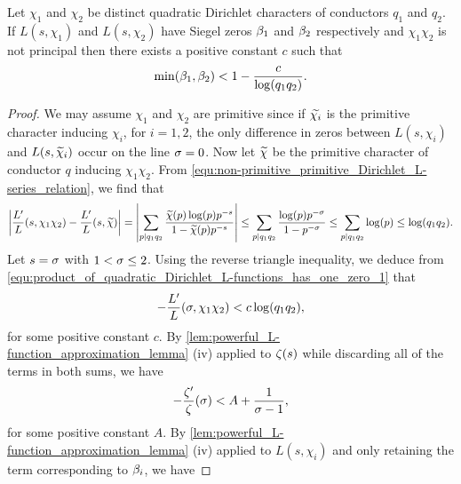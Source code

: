     \begin{proposition}\label{prop:product_of_quadratic_Dirichlet_L-functions_has_one_zero}
      Let $\chi_{1}$ and $\chi_{2}$ be distinct quadratic Dirichlet characters of conductors $q_{1}$ and $q_{2}$. If $L(s,\chi_{1})$ and $L(s,\chi_{2})$ have Siegel zeros $\beta_{1}$ and $\beta_{2}$ respectively and $\chi_{1}\chi_{2}$ is not principal then there exists a positive constant $c$ such that
      \[
        \min(\beta_{1},\beta_{2}) < 1-\frac{c}{\log(q_{1}q_{2})}.
      \]
    \end{proposition}
    \begin{proof}
        We may assume $\chi_{1}$ and $\chi_{2}$ are primitive since if $\widetilde{\chi_{i}}$ is the primitive character inducing $\chi_{i}$, for $i = 1,2$, the only difference in zeros between $L(s,\chi_{i})$ and $L(s,\widetilde{\chi}_{i})$ occur on the line $\sigma = 0$. Now let $\widetilde{\chi}$ be the primitive character of conductor $q$ inducing $\chi_{1}\chi_{2}$. From \cref{equ:non-primitive_primitive_Dirichlet_L-series_relation}, we find that
        \begin{equation}\label{equ:product_of_quadratic_Dirichlet_L-functions_has_one_zero_1}
          \left|\frac{L'}{L}(s,\chi_{1}\chi_{2})-\frac{L'}{L}(s,\widetilde{\chi})\right| = \left|\sum_{p \mid q_{1}q_{2}}\frac{\widetilde{\chi}(p)\log(p)p^{-s}}{1-\widetilde{\chi}(p)p^{-s}}\right| \le \sum_{p \mid q_{1}q_{2}}\frac{\log(p)p^{-\sigma}}{1-p^{-\sigma}} \le \sum_{p \mid q_{1}q_{2}}\log(p) \le \log(q_{1}q_{2}).
        \end{equation}
        Let $s = \sigma$ with $1 < \sigma \le 2$. Using the reverse triangle inequality, we deduce from \cref{equ:product_of_quadratic_Dirichlet_L-functions_has_one_zero_1} that
        \begin{equation}\label{equ:product_of_quadratic_Dirichlet_L-functions_has_one_zero_2}
          -\frac{L'}{L}(\sigma,\chi_{1}\chi_{2}) < c\log(q_{1}q_{2}),
        \end{equation}
        for some positive constant $c$.
        By \cref{lem:powerful_L-function_approximation_lemma} (iv) applied to $\zeta(s)$ while discarding all of the terms in both sums, we have
        \begin{equation}\label{equ:product_of_quadratic_Dirichlet_L-functions_has_one_zero_3}
          -\frac{\zeta'}{\zeta}(\sigma) < A+\frac{1}{\sigma-1},
        \end{equation}
        for some positive constant $A$. By \cref{lem:powerful_L-function_approximation_lemma} (iv) applied to $L(s,\chi_{i})$ and only retaining the term corresponding to $\beta_{i}$, we have

\end{proof}
